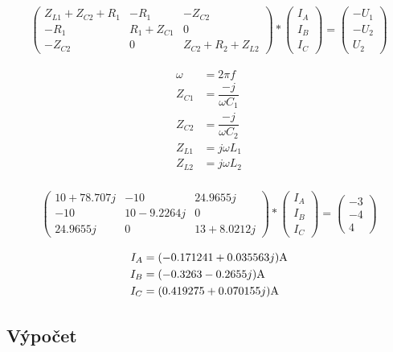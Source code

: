 \begin{align*}
	\begin{pmatrix}
		Z_{L1}+Z_{C2}+R_1&-R_1&-Z_{C2}\\ 
		-R_1&R_1+Z_{C1}&0\\ 
		-Z_{C2}&0&Z_{C2}+R_2+Z_{L2}
	\end{pmatrix}
	*
	\begin{pmatrix}
		I_A\\ I_B\\ I_C
	\end{pmatrix}
	=
	\begin{pmatrix}
		-U_1\\ -U_2\\ U_2
	\end{pmatrix}
\end{align*}


\begin{align*}
	\omega &= 2\pi f\\
	Z_{C1} &= \dfrac{-j}{\omega C_1} \\
	Z_{C2} &= \dfrac{-j}{\omega C_2}\\
	Z_{L1} &=  j\omega L_1 \\
	Z_{L2} &=  j\omega L_2 \\
\end{align*}

\begin{align*}
	\begin{pmatrix}
		10 + 78.707j&-10&24.9655j\\ 
		-10&10 - 9.2264j&0\\ 
		24.9655j&0&13 + 8.0212j
	\end{pmatrix}
	*
	\begin{pmatrix}
		I_A\\ I_B\\ I_C
	\end{pmatrix}
	=
	\begin{pmatrix}
		-3\\ -4\\ 4
	\end{pmatrix}
\end{align*}

\begin{align*}
	I_A &= (-0.171241 + 0.035563j)\Am \\
	I_B &= (-0.3263 - 0.2655j)\Am \\
	I_C &= (0.419275 + 0.070155j)\Am
\end{align*}

\subsection{Výpočet}

